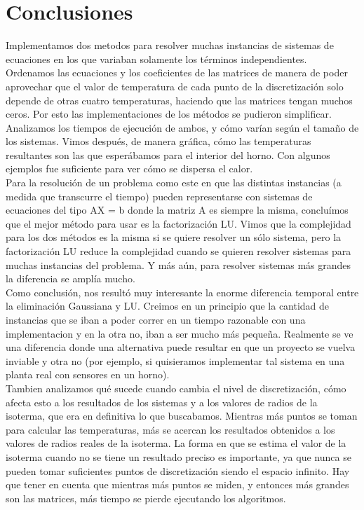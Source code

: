 \section{Conclusiones}
Implementamos dos metodos para resolver muchas instancias de sistemas de ecuaciones en los que variaban solamente los términos independientes. \\
Ordenamos las ecuaciones y los coeficientes de las matrices de manera de poder aprovechar que el valor de temperatura de cada punto de la discretización solo depende de otras cuatro temperaturas, haciendo que las matrices tengan muchos ceros. Por esto las implementaciones de los métodos se pudieron simplificar.\\

Analizamos los tiempos de ejecución de ambos, y cómo varían según el tamaño de los sistemas. Vimos después, de manera gráfica, cómo las temperaturas resultantes son las que esperábamos para el interior del horno. Con algunos ejemplos fue suficiente para ver cómo se dispersa el calor.\\

Para la resolución de un problema como este en que las distintas instancias (a medida que transcurre el tiempo) pueden representarse con sistemas de ecuaciones del tipo AX = b donde la matriz A es siempre la misma, concluímos que el mejor método para usar es la factorización LU. Vimos que la complejidad para los dos métodos es la misma si se quiere resolver un sólo sistema, pero la factorización LU reduce la complejidad cuando se quieren resolver sistemas para muchas instancias del problema. Y más aún, para resolver sistemas más grandes la diferencia se amplía mucho.\\

Como conclusión, nos resultó muy interesante la enorme diferencia temporal entre la eliminación Gaussiana y LU. Creimos en un principio que la cantidad de instancias que se iban a poder correr en un tiempo razonable con una implementacion y en la otra no, iban a ser mucho más pequeña. Realmente se ve una diferencia donde una alternativa puede resultar en que un proyecto se vuelva inviable y otra no (por ejemplo, si quisieramos implementar tal sistema en una planta real con sensores en un horno).\\

Tambien analizamos qué sucede cuando cambia el nivel de discretización, cómo afecta esto a los resultados de los sistemas y a los valores de radios de la isoterma, que era en definitiva lo que buscabamos. Mientras más puntos se toman para calcular las temperaturas, más se acercan los resultados obtenidos a los valores de radios reales de la isoterma. La forma en que se estima el valor de la isoterma cuando no se tiene un resultado preciso es importante, ya que nunca se pueden tomar suficientes puntos de discretización siendo el espacio infinito. Hay que tener en cuenta que mientras más puntos se miden, y entonces más grandes son las matrices, más tiempo se pierde ejecutando los algoritmos.\\

